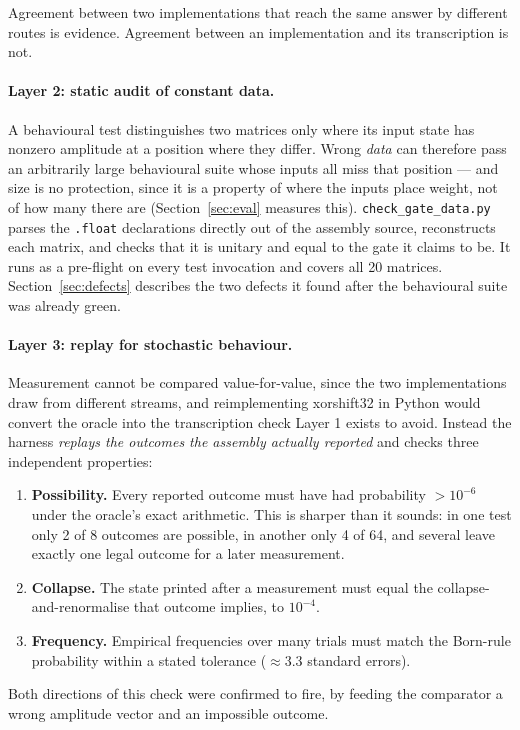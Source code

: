 \documentclass[11pt]{article}
\begin{document}
Agreement between two implementations that reach the same answer by different routes is
evidence. Agreement between an implementation and its transcription is not.

\paragraph{Layer 2: static audit of constant data.} A behavioural test distinguishes two
matrices only where its input state has nonzero amplitude at a position where they differ.
Wrong \emph{data} can therefore pass an arbitrarily large behavioural suite whose inputs
all miss that position --- and size is no protection, since it is a property of where the
inputs place weight, not of how many there are (Section~\ref{sec:eval} measures this).
\texttt{check\_gate\_data.py} parses the \texttt{.float} declarations directly out of the
assembly source, reconstructs each matrix, and checks that it is unitary and equal to the
gate it claims to be. It runs as a pre-flight on every test invocation and covers all 20
matrices. Section~\ref{sec:defects} describes the two defects it found after the
behavioural suite was already green.

\paragraph{Layer 3: replay for stochastic behaviour.} Measurement cannot be compared
value-for-value, since the two implementations draw from different streams, and
reimplementing xorshift32 in Python would convert the oracle into the transcription check
Layer 1 exists to avoid. Instead the harness \emph{replays the outcomes the assembly
actually reported} and checks three independent properties:
\begin{enumerate}
  \item \textbf{Possibility.} Every reported outcome must have had probability
    $> 10^{-6}$ under the oracle's exact arithmetic. This is sharper than it sounds: in one
    test only 2 of 8 outcomes are possible, in another only 4 of 64, and several leave
    exactly one legal outcome for a later measurement.
  \item \textbf{Collapse.} The state printed after a measurement must equal the
    collapse-and-renormalise that outcome implies, to $10^{-4}$.
  \item \textbf{Frequency.} Empirical frequencies over many trials must match the Born-rule
    probability within a stated tolerance ($\approx 3.3$ standard errors).
\end{enumerate}
Both directions of this check were confirmed to fire, by feeding the comparator a wrong
amplitude vector and an impossible outcome.
\end{document}
